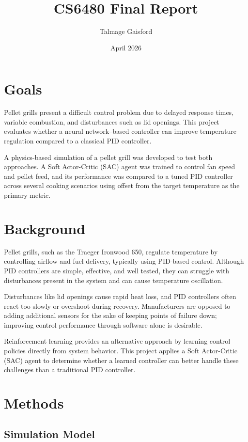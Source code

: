 \documentclass{article}
\title{CS6480 Final Report}
\author{Talmage Gaisford}
\date{April 2026}
\begin{document}
\maketitle

\section{Goals}

Pellet grills present a difficult control problem due to delayed 
response times, variable combustion, and disturbances such as lid openings.
This project evaluates whether a neural network–based controller can
improve temperature regulation compared to a classical PID controller.

A physics-based simulation of a pellet grill was developed to test both
approaches. A Soft Actor-Critic (SAC) agent was trained to control fan
speed and pellet feed, and its performance was compared to a tuned PID
controller across several cooking scenarios using offset from the target
temperature as the primary metric.


\section{Background}

Pellet grills, such as the Traeger Ironwood 650, regulate temperature by
controlling airflow and fuel delivery, typically using PID-based control.
Although PID controllers are simple, effective, and well tested, they can struggle with 
disturbances present in the system and can cause temperature oscillation.

Disturbances like lid openings cause rapid heat loss, and PID
controllers often react too slowly or overshoot during recovery. Manufacturers are opposed
to adding additional sensors for the sake of keeping points of failure down; improving control
performance through software alone is desirable.

Reinforcement learning provides an alternative approach by learning control
policies directly from system behavior. This project applies a Soft
Actor-Critic (SAC) agent to determine whether a learned controller can
better handle these challenges than a traditional PID controller.


\section{Methods}

\subsection{Simulation Model}
\end{document}

